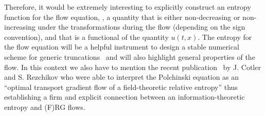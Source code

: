 Therefore, it would be extremely interesting to explicitly construct an entropy function for the flow equation, \ie{}, a quantity that is either non-decreasing or non-increasing under the \rg{} transformations during the \frg{} flow (depending on the sign convention), and that is a functional of the quantity $u ( t, x )$.
The entropy for the flow equation will be a helpful instrument to design a stable numerical scheme for generic truncations~\cite{LeVeque:1992,LeVeque:2002,RezzollaZanotti:2013} and will also highlight general properties of the \grg{} flow.
In this context we also have to mention the recent publication~\cite{Cotler:2022fze} by J. Cotler and S. Rezchikov who were able to interpret the Polchinski equation as an ``optimal transport gradient flow of a field-theoretic relative entropy'' thus establishing a firm and explicit connection between an information-theoretic entropy and (F)RG flows.

